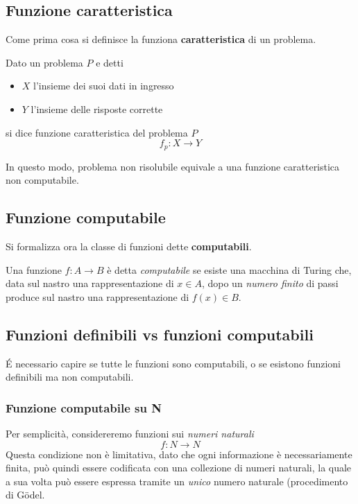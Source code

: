 \subsection{Funzione caratteristica}
Come prima cosa si definisce la funziona \textbf{caratteristica} di un problema.

\begin{mdframed}[topline=false,bottomline=false,rightline=false]
    Dato un problema $P$ e detti
    \begin{itemize}
        \item $X$ l'insieme dei suoi dati in ingresso
        \item $Y$ l'insieme delle risposte corrette
    \end{itemize}
    si dice funzione caratteristica del problema $P$
    \begin{equation*}
        f_p: X \rightarrow Y
    \end{equation*}
\end{mdframed}

In questo modo, problema non risolubile equivale a una funzione caratteristica non computabile.

\subsection{Funzione computabile}
Si formalizza ora la classe di funzioni dette \textbf{computabili}.

\begin{mdframed}[topline=false,bottomline=false,rightline=false]
    Una funzione $f:A \rightarrow B$ è detta \textit{computabile} se esiste una macchina di Turing che, data sul nastro una rappresentazione di $x \in A$, dopo un \textit{numero finito} di passi produce sul nastro una rappresentazione di $f(x) \in B$.
\end{mdframed}

\subsection{Funzioni definibili vs funzioni computabili}
É necessario capire se tutte le funzioni sono computabili, o se esistono funzioni definibili ma non computabili.

\subsubsection{Funzione computabile su N}
Per semplicità, considereremo funzioni sui \textit{numeri naturali}
\begin{equation*}
    f: N \rightarrow N
\end{equation*}
Questa condizione non è limitativa, dato che ogni informazione è necessariamente finita, può quindi essere codificata con una collezione di numeri naturali, la quale a sua volta può essere espressa tramite un \textit{unico} numero naturale (procedimento di Gödel.

